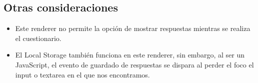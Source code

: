 \subsection{Otras consideraciones}
\label{subsec:Apendice2.17}

\begin{itemize}
  \item Este renderer no permite la opci\'on de mostrar respuestas mientras se realiza el cuestionario.
  \item El Local Storage tambi\'en funciona en este renderer, sin embargo, al ser un JavaScript, el evento de guardado de respuestas se dispara al perder el foco
  el input o textarea en el que nos encontramos.
\end{itemize}